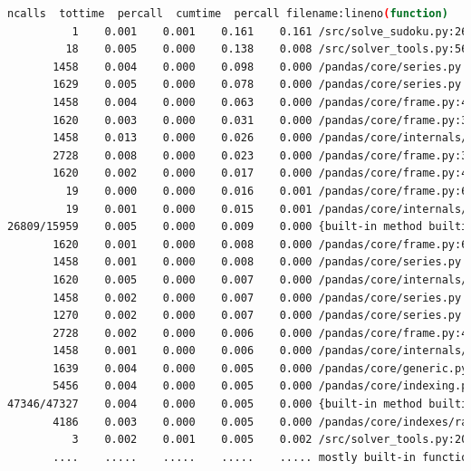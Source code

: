 \documentclass[12pt]{report} %
\begin{document}
\begin{lstlisting}[language=Bash, caption={Profiling output for easy sudoku},basicstyle=\tiny]
          ncalls  tottime  percall  cumtime  percall filename:lineno(function)
          1    0.001    0.001    0.161    0.161 /src/solve_sudoku.py:26(solve_sudoku)
         18    0.005    0.000    0.138    0.008 /src/solver_tools.py:56(markup)
       1458    0.004    0.000    0.098    0.000 /pandas/core/series.py:1180(__setitem__)
       1629    0.005    0.000    0.078    0.000 /pandas/core/series.py:1396(_maybe_update_cacher)
       1458    0.004    0.000    0.063    0.000 /pandas/core/frame.py:4430(_maybe_cache_changed)
       1620    0.003    0.000    0.031    0.000 /pandas/core/frame.py:3779(_ixs)
       1458    0.013    0.000    0.026    0.000 /pandas/core/internals/managers.py:1045(iset)
       2728    0.008    0.000    0.023    0.000 /pandas/core/frame.py:3856(__getitem__)
       1620    0.002    0.000    0.017    0.000 /pandas/core/frame.py:4387(_box_col_values)
         19    0.000    0.000    0.016    0.001 /pandas/core/frame.py:668(__init__)
         19    0.001    0.000    0.015    0.001 /pandas/core/internals/construction.py:423(dict_to_mgr)
26809/15959    0.005    0.000    0.009    0.000 {built-in method builtins.len}
       1620    0.001    0.000    0.008    0.000 /pandas/core/frame.py:656(_constructor_sliced_from_mgr)
       1458    0.001    0.000    0.008    0.000 /pandas/core/series.py:1270(_set_with_engine)
       1620    0.005    0.000    0.007    0.000 /pandas/core/internals/managers.py:991(iget)
       1458    0.002    0.000    0.007    0.000 /pandas/core/series.py:1385(_check_is_chained_assignment_possible)
       1270    0.002    0.000    0.007    0.000 /pandas/core/series.py:1016(__getitem__)
       2728    0.002    0.000    0.006    0.000 /pandas/core/frame.py:4405(_get_item_cache)
       1458    0.001    0.000    0.006    0.000 /pandas/core/internals/managers.py:1977(setitem_inplace)
       1639    0.004    0.000    0.005    0.000 /pandas/core/generic.py:6147(__finalize__)
       5456    0.004    0.000    0.005    0.000 /pandas/core/indexing.py:2678(check_dict_or_set_indexers)
47346/47327    0.004    0.000    0.005    0.000 {built-in method builtins.isinstance}
       4186    0.003    0.000    0.005    0.000 /pandas/core/indexes/range.py:394(__contains__)
          3    0.002    0.001    0.005    0.002 /src/solver_tools.py:20(check_sudoku)
       ....    .....    .....    .....    ..... mostly built-in functions of packages
\end{lstlisting}
\end{document}
